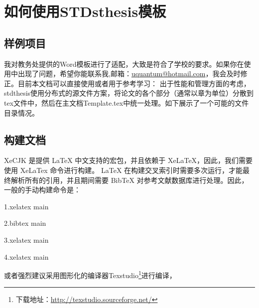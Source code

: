 
\chapter{如何使用STDsthesis模板}
\section{样例项目}
我对教务处提供的Word模板进行了适配，大致是符合了学校的要求。如果你在使用中出现了问题，希望你能联系我,邮箱：\href{uquantum@hotmail.com}{uquantum@hotmail.com}，我会及时修正。目前本文档可以直接使用或者用于参考学习：
出于性能和管理方面的考虑，stdthesis使用分布式的源文件方案，将论文的各个部分（通常以章为单位）分散到tex文件中，然后在主文档Template.tex中统一处理。如下展示了一个可能的文件目录情况。

\section{构建文档}
XeCJK 是提供 LaTeX 中文支持的宏包，并且依赖于 XeLaTeX，因此，我们需要使用 XeLaTex 命令进行构建。
LaTeX 在构建交叉索引时需要多次运行，才能最终解析所有的引用，并且期间需要 BibTeX 对参考文献数据库进行处理。因此，一般的手动构建命令是：

1.xelatex main

2.bibtex main

3.xelatex main

4.xelatex main

或者强烈建议采用图形化的编译器Texstudio\footnote{下载地址：\href{http://texstudio.sourceforge.net/}{http://texstudio.sourceforge.net/}}进行编译，
